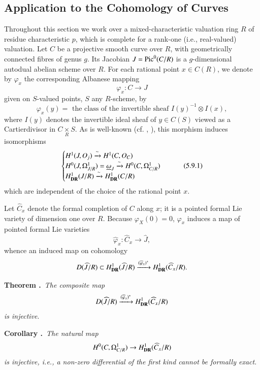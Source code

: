 \subsection{Application to the Cohomology of Curves}\label{art6-sec5.9}
Throughout this section we work over a mixed-characteristic valuation ring $R$ of residue characteristic $p$, which is complete for a rank-one (i.e., real-valued) valuation. Let $C$ be a projective smooth curve over $R$, with geometrically connected fibres of genus $g$. Its Jacobian $J=\operatorname{Pic}^{0}(C/R)$ is a $g$-dimensional autodual abelian scheme over $R$. For each rational point $x\in C(R)$, we denote by $\varphi_{x}$ the corresponding Albanese mapping 
$$
\varphi_{x} : C\to J
$$
given on $S$-valued points, $S$ any $R$-scheme, by
$$
\varphi_{x}(y)=\text{~the class of the invertible sheaf~}I(y)^{-1}\otimes I(x),
$$
where $I(y)$ denotes the invertible ideal sheaf of $y\in C(S)$ viewed as a Cartier\pageoriginale divisor in $C{\displaystyle{\mathop{\times}\limits_{R}}}S$. As is well-known (cf. \cite{art6-key44}, \cite{art6-key45}), this morphism induces isomorphisms
\begin{equation*}
\begin{cases}
H^{1}(J,O_{j})\xrightarrow{\sim} H^{1}(C,O_{C})\\
H^{0}(J,\Omega^{1}_{J/R})=\underline{\omega}_{J}\xrightarrow{\sim}H^{0}(C,\Omega^{1}_{C/R})\\
H^{1}_{\mathbf{DR}}(J/R)\xrightarrow{\sim} H^{1}_{\mathbf{DR}}(C/R)
\end{cases}\tag{5.9.1}\label{art6-eq5.9.1}
\end{equation*}
which are independent of the choice of the rational point $x$.

\vfill\eject

Let $\widehat{C}_{x}$ denote the formal completion of $C$ along $x$; it is a pointed formal Lie variety of dimension one over $R$. Because $\varphi_{X}(0)=0$, $\varphi_{x}$ induces a map of pointed formal Lie varieties
$$
\widehat{\varphi}_{x}:\widehat{C}_{x}\to \widehat{J},
$$
whence an induced map on cohomology
$$
D(\widehat{J}/R)\subset H^{1}_{\mathbf{DR}}(\widehat{J}/R)\xrightarrow{(\widehat{\varphi}_{x})^{*}}H^{1}_{\mathbf{DR}}(\widehat{C}_{x}/R).
$$

\medskip
\noindent
{\bf Theorem .\label{art6-thm5.9.2}}~{\em The composite map}
$$
D(\widehat{J}/R)\xrightarrow{(\widehat{\varphi}_{x})^{*}}H^{1}_{\mathbf{DR}}(\widehat{C}_{x}/R)
$$
{\em is injective}.

\medskip
\noindent
{\bf Corollary .\label{art6-coro5.9.3}}~{\em The natural map}
$$
H^{0}(C,\Omega^{1}_{C/R})\to H^{1}_{\mathbf{DR}}(\widehat{C}_{x}/R)
$$
{\em is injective, i.e., a non-zero differential of the first kind cannot be formally exact}.
\smallskip

